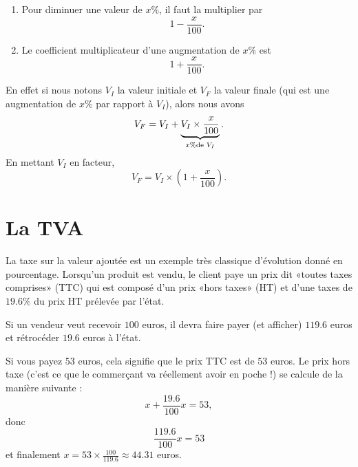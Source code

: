 \begin{Aretenir}
    \begin{enumerate}
        \item
            Pour diminuer une valeur de \( x\%\), il faut la multiplier par 
            \begin{equation}
                1-\frac{ x }{ 100 }.
            \end{equation}
        \item
            Le coefficient multiplicateur d'une augmentation de \( x\%\) est
            \begin{equation}
                1+\frac{ x }{ 100 }.
            \end{equation}
    \end{enumerate}
\end{Aretenir}

En effet si nous notons \( V_I\) la valeur initiale et \( V_F\) la valeur finale (qui est une augmentation de \( x\%\) par rapport à \( V_I\)), alors nous avons
\begin{equation}
    V_F=V_I+\underbrace{V_I\times \frac{ x }{ 100 }}_{x\% \text{de \( V_I\)}}.
\end{equation}
En mettant \( V_I\) en facteur,
\begin{equation}
    V_F=V_I\times \left( 1+\frac{ x }{ 100 } \right).
\end{equation}

\section{La TVA}

La taxe sur la valeur ajoutée est un exemple très classique d'évolution donné en pourcentage. Lorsqu'un produit est vendu, le client paye un prix dit «toutes taxes comprises» (TTC) qui est composé d'un prix «hors taxes» (HT) et d'une taxes de \( 19.6\%\) du prix HT prélevée par l'état.

\begin{example}
    Si un vendeur veut recevoir \( 100\) euros, il devra faire payer (et afficher) \( 119.6\) euros et rétrocéder \( 19.6\) euros à l'état.
\end{example}

\begin{example}
    Si vous payez \( 53\) euros, cela signifie que le prix TTC est de \( 53\) euros. Le prix hors taxe (c'est ce que le commerçant va réellement avoir en poche !) se calcule de la manière suivante :
    \begin{equation}
        x+\frac{ 19.6 }{ 100 }x=53,
    \end{equation}
    donc
    \begin{equation}
        \frac{ 119.6 }{ 100 }x=53
    \end{equation}
    et finalement \( x=53\times\frac{ 100 }{ 119.6 }\approx 44.31\) euros.
\end{example}

